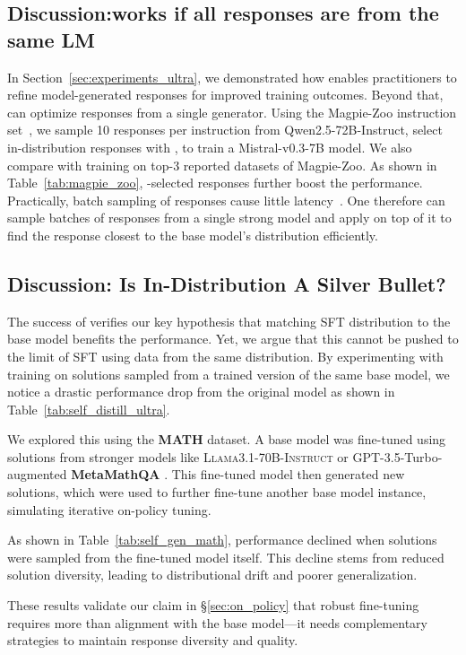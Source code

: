 
\subsection{Discussion:\name works if all responses are from the same LM}

In Section~\ref{sec:experiments_ultra}, we demonstrated how \name enables practitioners to refine model-generated responses for improved training outcomes. Beyond that, \name can optimize responses from a single generator. Using the Magpie-Zoo instruction set~\cite{xu2024strongermodelsstrongerteachers}, we sample 10 responses per instruction from Qwen2.5-72B-Instruct, select in-distribution responses with \name, to train a Mistral-v0.3-7B model. We also compare with training on top-3 reported datasets of Magpie-Zoo. As shown in Table~\ref{tab:magpie_zoo}, \name-selected responses further boost the performance. Practically, batch sampling of responses cause little latency~\cite{zhong2024distservedisaggregatingprefilldecoding,zhou2024survey}. One therefore can sample batches of responses from a single strong model and apply \name on top of it to find the response closest to the base model's distribution efficiently. 

\subsection{Discussion: Is In-Distribution A Silver Bullet?}
\label{sec:self_distillation}
The success of \name verifies our key hypothesis that matching SFT distribution to the base model benefits the performance. Yet, we argue that this cannot be pushed to the limit of SFT using data from the same distribution. 
By experimenting with training on solutions sampled from a trained version of the same base model, we notice a drastic performance drop from the original model as shown in Table~\ref{tab:self_distill_ultra}. 

We explored this using the \textbf{MATH} \cite{hendrycks2021measuringmathematicalproblemsolving} dataset. A base model was fine-tuned using solutions from stronger models like \textsc{Llama3.1-70B-Instruct} or GPT-3.5-Turbo-augmented \textbf{MetaMathQA} \cite{yu2024metamath}. This fine-tuned model then generated new solutions, which were used to further fine-tune another base model instance, simulating iterative on-policy tuning.

As shown in Table~\ref{tab:self_gen_math}, performance declined when solutions were sampled from the fine-tuned model itself. This decline stems from reduced solution diversity, leading to distributional drift and poorer generalization. 

These results validate our claim in \S\ref{sec:on_policy} that robust fine-tuning requires more than alignment with the base model—it needs complementary strategies to maintain response diversity and quality. 